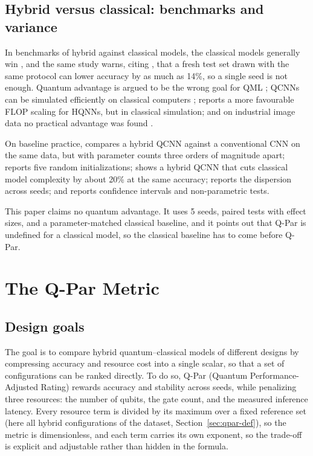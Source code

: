 \documentclass{ieeeaccess}
\begin{document}
\subsection{Hybrid versus classical: benchmarks and variance}
\label{sec:rw-classical}

In benchmarks of hybrid against classical models, the classical models generally win \cite{bowles2024better}, and the same study warns, citing \cite{recht2019imagenet}, that a fresh test set drawn with the same protocol can lower accuracy by as much as 14\%, so a single seed is not enough. Quantum advantage is argued to be the wrong goal for QML \cite{schuld2022advantage}; QCNNs can be simulated efficiently on classical computers \cite{bermejo2026simulable}; \cite{kashif2025myth} reports a more favourable FLOP scaling for HQNNs, but in classical simulation; and on industrial image data no practical advantage was found \cite{basilewitsch2025practice}.

On baseline practice, \cite{ajlouni2023hqcnn} compares a hybrid QCNN against a conventional CNN on the same data, but with parameter counts three orders of magnitude apart; \cite{hur2022qcnn} reports five random initializations; \cite{domingo2023binding} shows a hybrid QCNN that cuts classical model complexity by about 20\% at the same accuracy; \cite{dinut2026fraud} reports the dispersion across seeds; and \cite{yu2026qcnnvqc} reports confidence intervals and non-parametric tests.

This paper claims no quantum advantage. It uses 5 seeds, paired tests with effect sizes, and a parameter-matched classical baseline, and it points out that Q-Par is undefined for a classical model, so the classical baseline has to come before Q-Par.

\section{The Q-Par Metric}
\label{sec:qpar}

\subsection{Design goals}
\label{sec:qpar-goals}

The goal is to compare hybrid quantum--classical models of different designs by compressing accuracy and resource cost into a single scalar, so that a set of configurations can be ranked directly. To do so, Q-Par (Quantum Performance-Adjusted Rating) rewards accuracy and stability across seeds, while penalizing three resources: the number of qubits, the gate count, and the measured inference latency. Every resource term is divided by its maximum over a fixed reference set (here all hybrid configurations of the dataset, Section~\ref{sec:qpar-def}), so the metric is dimensionless, and each term carries its own exponent, so the trade-off is explicit and adjustable rather than hidden in the formula.
\end{document}
